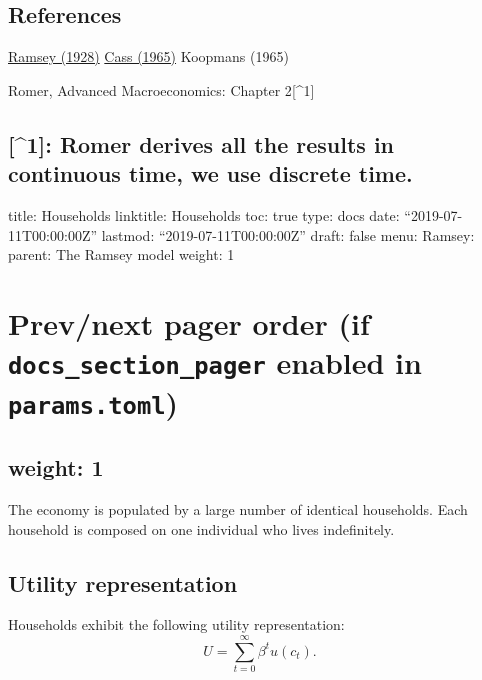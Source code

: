\documentclass[11pt,a4paper,english]{article}
\begin{document}
\hypertarget{references}{%
\subsection{References}\label{references}}

\href{https://doi.org/10.2307/2224098}{Ramsey (1928)}
\href{https://doi.org/10.2307/2295827}{Cass (1965)} Koopmans (1965)

Romer, Advanced Macroeconomics: Chapter 2{[}\^{}1{]}

\hypertarget{romer-derives-all-the-results-in-continuous-time-we-use-discrete-time.}{%
\subsection{{[}\^{}1{]}: Romer derives all the results in continuous
time, we use discrete
time.}\label{romer-derives-all-the-results-in-continuous-time-we-use-discrete-time.}}

title: Households linktitle: Households toc: true type: docs date:
``2019-07-11T00:00:00Z'' lastmod: ``2019-07-11T00:00:00Z'' draft: false
menu: Ramsey: parent: The Ramsey model weight: 1

\hypertarget{prevnext-pager-order-if-docs_section_pager-enabled-in-params.toml}{%
\section{\texorpdfstring{Prev/next pager order (if
\texttt{docs\_section\_pager} enabled in
\texttt{params.toml})}{Prev/next pager order (if docs\_section\_pager enabled in params.toml)}}\label{prevnext-pager-order-if-docs_section_pager-enabled-in-params.toml}}

\hypertarget{weight-1}{%
\subsection{weight: 1}\label{weight-1}}

The economy is populated by a large number of identical households. Each
household is composed on one individual who lives indefinitely.

\hypertarget{utility-representation}{%
\subsection{Utility representation}\label{utility-representation}}

Households exhibit the following utility representation:
\[U = \sum_{t=0}^{\infty} \beta^{t} u(c_{t}).\]
\end{document}
